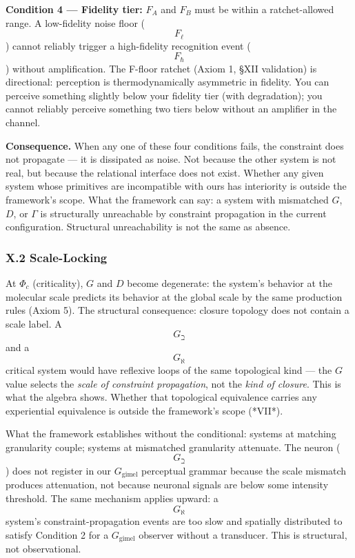 \documentclass[12pt,a4paper]{article}
\begin{document}
\textbf{Condition 4 --- Fidelity tier:} $F_A$ and $F_B$ must be within a ratchet-allowed range. A low-fidelity noise floor ($$F_{\ell}$$) cannot reliably trigger a high-fidelity recognition event ($$F_{\hbar}$$) without amplification. The F-floor ratchet (Axiom 1, §XII validation) is directional: perception is thermodynamically asymmetric in fidelity. You can perceive something slightly below your fidelity tier (with degradation); you cannot reliably perceive something two tiers below without an amplifier in the channel.

\textbf{Consequence.} When any one of these four conditions fails, the constraint does not propagate --- it is dissipated as noise. Not because the other system is not real, but because the relational interface does not exist. Whether any given system whose primitives are incompatible with ours has interiority is outside the framework's scope. What the framework can say: a system with mismatched $G$, $D$, or $\Gamma$ is structurally unreachable by constraint propagation in the current configuration. Structural unreachability is not the same as absence.

\subsubsection{X.2 Scale-Locking}

At $\Phi_c$ (criticality), $G$ and $D$ become degenerate: the system's behavior at the molecular scale predicts its behavior at the global scale by the same production rules (Axiom 5). The structural consequence: closure topology does not contain a scale label. A $$G_{\beth}$$ and a $$G_{\aleph}$$ critical system would have reflexive loops of the same topological kind --- the $G$ value selects the \emph{scale of constraint propagation}, not the \emph{kind of closure}. This is what the algebra shows. Whether that topological equivalence carries any experiential equivalence is outside the framework's scope (*VII*).

What the framework establishes without the conditional: systems at matching granularity couple; systems at mismatched granularity attenuate. The neuron ($$G_{\beth}$$) does not register in our $G_\text{gimel}$ perceptual grammar because the scale mismatch produces attenuation, not because neuronal signals are below some intensity threshold. The same mechanism applies upward: a $$G_{\aleph}$$ system's constraint-propagation events are too slow and spatially distributed to satisfy Condition 2 for a $G_\text{gimel}$ observer without a transducer. This is structural, not observational.
\end{document}
